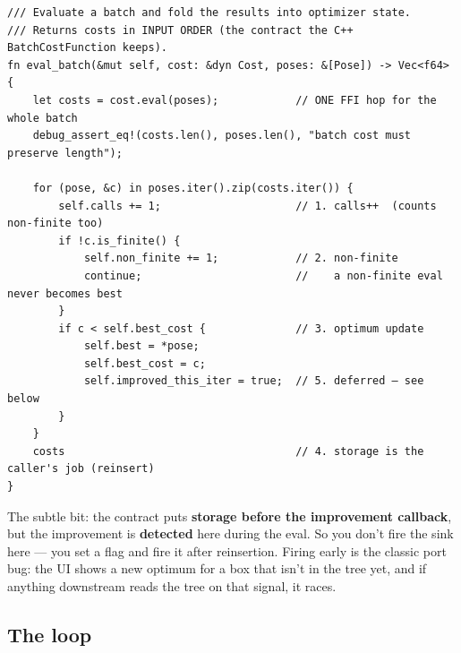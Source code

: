 \documentclass[11pt]{article}
\begin{document}
\begin{verbatim}
/// Evaluate a batch and fold the results into optimizer state.
/// Returns costs in INPUT ORDER (the contract the C++ BatchCostFunction keeps).
fn eval_batch(&mut self, cost: &dyn Cost, poses: &[Pose]) -> Vec<f64> {
    let costs = cost.eval(poses);            // ONE FFI hop for the whole batch
    debug_assert_eq!(costs.len(), poses.len(), "batch cost must preserve length");

    for (pose, &c) in poses.iter().zip(costs.iter()) {
        self.calls += 1;                     // 1. calls++  (counts non-finite too)
        if !c.is_finite() {
            self.non_finite += 1;            // 2. non-finite
            continue;                        //    a non-finite eval never becomes best
        }
        if c < self.best_cost {              // 3. optimum update
            self.best = *pose;
            self.best_cost = c;
            self.improved_this_iter = true;  // 5. deferred — see below
        }
    }
    costs                                    // 4. storage is the caller's job (reinsert)
}
\end{verbatim}

The subtle bit: the contract puts \textbf{\textbf{storage before the improvement callback}},
but the improvement is \textbf{detected} here during the eval. So you don't fire the
sink here — you set a flag and fire it after reinsertion. Firing early is the
classic port bug: the UI shows a new optimum for a box that isn't in the tree
yet, and if anything downstream reads the tree on that signal, it races.
\subsection{The loop}
\label{sec:orgcb7b416}
\end{document}

